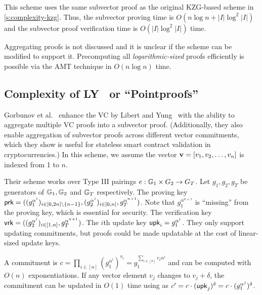 This scheme uses the same subvector proof as the original KZG-based scheme in \cref{s:complexity-kzg}.
Thus, the subvector proving time is $O(n\log{n}+|I|\log^2{|I|})$ and the subvector proof verification time is $O(|I|\log^2{|I|})$ time.

Aggregating proofs is not discussed and it is unclear if the scheme can be modified to support it.
Precomputing all \textit{logarithmic-sized} proofs efficiently is possible via the AMT technique in $O(n\log{n})$ time.

\subsection{Complexity of LY~\cite{GRWZ20,LY10} or ``Pointproofs''}
\label{s:complexity:pointproofs}
Gorbunov et al.~\cite{GRWZ20} enhance the VC by Libert and Yung~\cite{LY10} with the ability to aggregate multiple VC proofs into a subvector proof.
(Additionally, they also enable aggregation of subvector proofs across different vector commitments, which they show is useful for stateless smart contract validation in cryptocurrencies.)
In this scheme, we assume the vector $\bm{\mathrm{v}}=[v_1, v_2, \dots, v_n]$ is indexed from 1 to $n$.

Their scheme works over Type III pairings $e : \mathbb{G}_1 \times G_2\rightarrow G_T$.
Let $g_1,g_2,g_T$ be generators of $\mathbb{G}_1, \mathbb{G}_2$ and $\mathbb{G}_T$ respectively.
The proving key $\mathsf{prk} = ((g_1^{\alpha^i})_{i\in[0,2n]\setminus\{n-1\}},(g_2^{\alpha^i})_{i\in[0,n]}, g_T^{\alpha^{n+1}})$.
Note that $g_1^{\alpha^{n+1}}$ is ``missing'' from the proving key, which is essential for security.
The verification key $\mathsf{vrk}=((g_2^{\alpha^i})_{i\in[1,n]},g_T^{\alpha^{n+1}})$.
The $i$th update key $\mathsf{upk}_i=g_1^{\alpha^i}$.
They only support updating commitments, but proofs could be made updatable at the cost of linear-sized update keys.

A commitment is $c=\prod_{i\in[n]} \left(g_1^{\alpha^i}\right)^{v_i}=g_1^{\sum_{i\in [n]} v_i\alpha^i}$ and can be computed with $O(n)$ exponentiations.
If any vector element $v_j$ changes to $v_j + \delta$, the commitment can be updated in $O(1)$ time using as $c' = c \cdot (\mathsf{upk}_j)^{\delta} = c\cdot (g_1^{\alpha^j})^{\delta}$.

